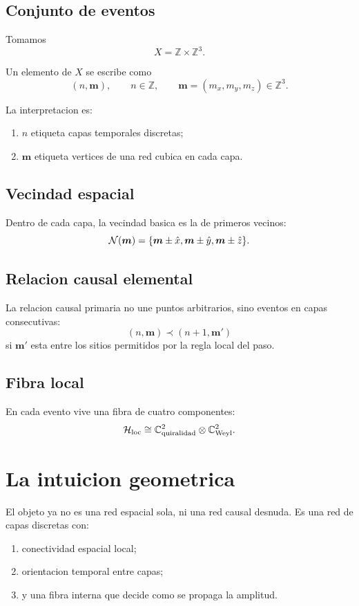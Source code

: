 \subsection{Conjunto de eventos}
Tomamos
\begin{equation}
X=\mathbb{Z}\times\mathbb{Z}^3.
\end{equation}

Un elemento de \(X\) se escribe como
\begin{equation}
(n,\bm{m}),
\qquad
n\in\mathbb{Z},
\qquad
\bm{m}=(m_x,m_y,m_z)\in\mathbb{Z}^3.
\end{equation}

La interpretacion es:
\begin{enumerate}[label=\arabic*.]
    \item \(n\) etiqueta capas temporales discretas;
    \item \(\bm{m}\) etiqueta vertices de una red cubica en cada capa.
\end{enumerate}

\subsection{Vecindad espacial}
Dentro de cada capa, la vecindad basica es la de primeros vecinos:
\begin{equation}
\mathcal{N}(\bm{m})=
\{\bm{m}\pm \hat{x},\bm{m}\pm \hat{y},\bm{m}\pm \hat{z}\}.
\end{equation}

\subsection{Relacion causal elemental}
La relacion causal primaria no une puntos arbitrarios, sino eventos en capas consecutivas:
\begin{equation}
(n,\bm{m}) \prec (n+1,\bm{m}')
\end{equation}
si \(\bm{m}'\) esta entre los sitios permitidos por la regla local del paso.

\subsection{Fibra local}
En cada evento vive una fibra de cuatro componentes:
\begin{equation}
\mathcal{H}_{\mathrm{loc}}\cong \mathbb{C}^2_{\mathrm{quiralidad}}\otimes \mathbb{C}^2_{\mathrm{Weyl}}.
\label{c28:eq:fiber}
\end{equation}

\section{La intuicion geometrica}
El objeto ya no es una red espacial sola, ni una red causal desnuda. Es una red de capas discretas con:
\begin{enumerate}[label=\arabic*.]
    \item conectividad espacial local;
    \item orientacion temporal entre capas;
    \item y una fibra interna que decide como se propaga la amplitud.
\end{enumerate}

